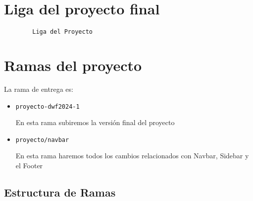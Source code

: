 \documentclass[a4paper,12pt]{article}
\begin{document}



\newpage

\section{Liga del proyecto final}


    \begin{verbatim}
        Liga del Proyecto 
    \end{verbatim}            



\section{Ramas del proyecto}

La rama de entrega es:
\begin{itemize}
    \item[]  \texttt{proyecto-dwf2024-1}
    
                En esta rama subiremos la versión final del proyecto 

    \item[]  \texttt{proyecto/navbar}
    
                En esta rama haremos todos los cambios relacionados con Navbar, Sidebar y el Footer
\end{itemize}



\subsection{Estructura de Ramas}
\end{document}
